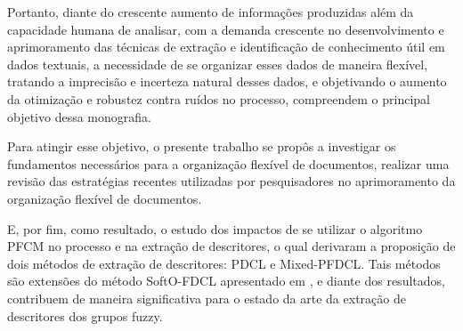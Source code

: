 Portanto, diante do crescente aumento de informações produzidas além da capacidade humana de
analisar, com a demanda crescente no desenvolvimento e aprimoramento das técnicas de extração e
identificação de conhecimento útil em dados textuais, a necessidade de se organizar esses dados de
maneira flexível, tratando a imprecisão e incerteza natural desses dados, e objetivando o aumento da
otimização e robustez contra ruídos no processo, compreendem o principal objetivo dessa monografia.

Para atingir esse objetivo, o presente trabalho se propôs a investigar os fundamentos
necessários para a organização flexível de documentos, realizar uma revisão das estratégias recentes
utilizadas por pesquisadores no aprimoramento da organização flexível de documentos. 

E, por fim, como resultado, o estudo dos impactos de se utilizar o algoritmo PFCM no processo e na
extração de descritores, o qual derivaram a proposição de dois métodos de extração de descritores:
PDCL e Mixed-PFDCL. Tais métodos são extensões do método SoftO-FDCL apresentado em
\cite{Nogueira2013}, e diante dos resultados, contribuem de maneira significativa para o estado da
arte da extração de descritores dos grupos fuzzy.

